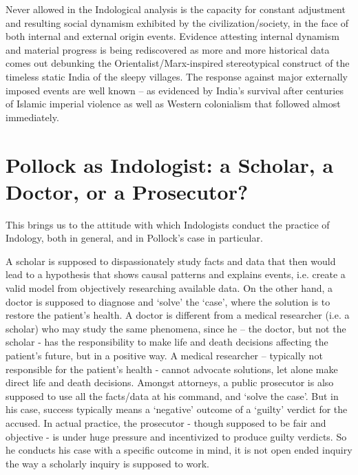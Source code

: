 Never allowed in the Indological analysis is the capacity for constant adjustment and resulting social dynamism exhibited by the civilization/society, in the face of both internal and external origin events. Evidence attesting internal dynamism and material progress is being rediscovered as more and more historical data comes out debunking the Orientalist/Marx-inspired stereotypical construct of the timeless static India of the sleepy villages. The response against major externally imposed events are well known -- as evidenced by India’s survival after centuries of Islamic imperial violence as well as Western colonialism that followed almost immediately.


\section*{Pollock as Indologist: a Scholar, a Doctor, or a Prosecutor?}

This brings us to the attitude with which Indologists conduct the practice of Indology, both in general, and in Pollock’s case in particular.

A scholar is supposed to dispassionately study facts and data that then would lead to a hypothesis that shows causal patterns and explains events, i.e. create a valid model from objectively researching available data. On the other hand, a doctor is supposed to diagnose and ‘solve’ the ‘case’, where the solution is to restore the patient’s health. A doctor is different from a medical researcher (i.e. a scholar) who may study the same phenomena, since he – the doctor, but not the scholar - has the responsibility to make life and death decisions affecting the patient’s future, but in a positive way. A medical researcher – typically not responsible for the patient’s health - cannot advocate solutions, let alone make direct life and death decisions. Amongst attorneys, a public prosecutor is also supposed to use all the facts/data at his command, and ‘solve the case’. But in his case, success typically means a ‘negative’ outcome of a ‘guilty’ verdict for the accused. In actual practice, the prosecutor - though supposed to be fair and objective - is under huge pressure and incentivized to produce guilty verdicts. So he conducts his case with a specific outcome in mind, it is not open ended inquiry the way a scholarly inquiry is supposed to work.

